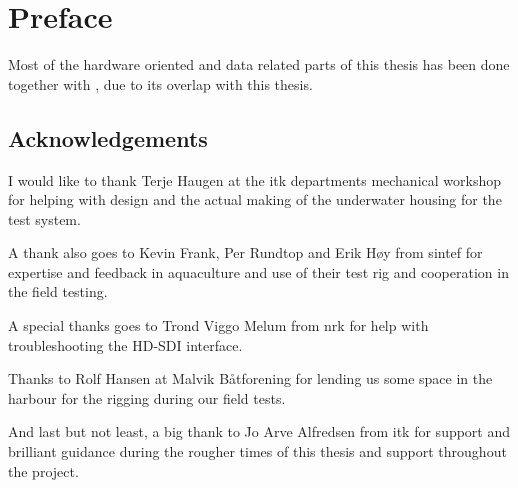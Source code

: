 
\chapter{Preface}


Most of the hardware oriented and data related parts of this thesis 
has been done together with \citet{sletta13}, due to its overlap with 
this thesis. 

\section{Acknowledgements}

I would like to thank Terje Haugen at the \gls{itk} departments mechanical workshop for 
helping with design and the actual making of the underwater housing for the test system.

A thank also goes to Kevin Frank, Per Rundtop and Erik Høy from \gls{sintef} for expertise and
feedback in aquaculture and use of their test rig and cooperation in the field testing. 

A special thanks goes to Trond Viggo Melum from \gls{nrk} for help with troubleshooting the HD-SDI interface.

Thanks to Rolf Hansen at Malvik Båtforening for lending us some space in the harbour for the rigging during our field
tests.

And last but not least, a big thank to Jo Arve Alfredsen from \gls{itk} for support and 
brilliant guidance during the rougher times of this thesis and support throughout the project.